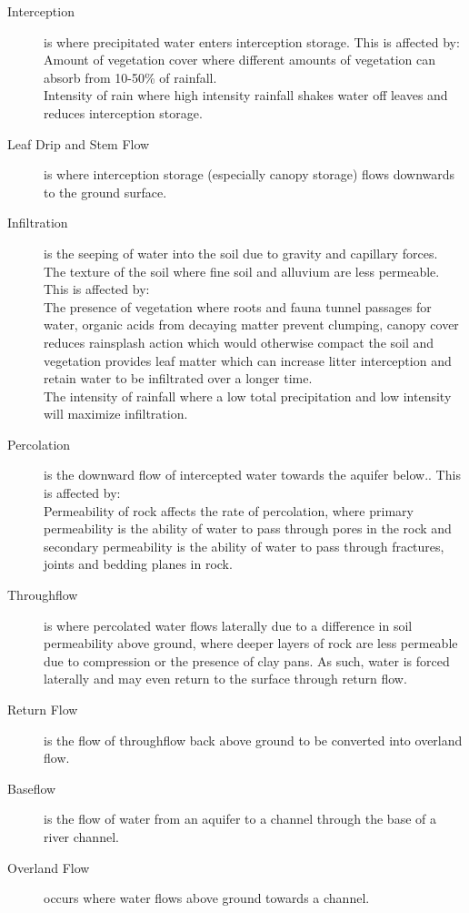 \documentclass[../../main]{subfiles}
\begin{document}
	\begin{description}
		\item[Interception] is where precipitated water enters interception storage. This is affected by:\\
			Amount of vegetation cover where different amounts of vegetation can absorb from 10-50\% of rainfall. \\
			Intensity of rain where high intensity rainfall shakes water off leaves and reduces interception storage.
		\item[Leaf Drip and Stem Flow] is where interception storage (especially canopy storage) flows downwards to the ground surface.
		\item[Infiltration] is the seeping of water into the soil due to gravity and capillary forces. \\
			The texture of the soil where fine soil and alluvium are less permeable. This is affected by:\\
			The presence of vegetation where roots and fauna tunnel passages for water, organic acids from decaying matter prevent clumping, canopy cover reduces rainsplash action which would otherwise compact the soil and vegetation provides leaf matter which can increase litter interception and retain water to be infiltrated over a longer time. \\
			The intensity of rainfall where a low total precipitation and low intensity will maximize infiltration.
		\item[Percolation] is the downward flow of intercepted water towards the aquifer below.. This is affected by: \\
			Permeability of rock affects the rate of percolation, where primary permeability is the ability of water to pass through pores in the rock and secondary permeability is the ability of water to pass through fractures, joints and bedding planes in rock.
		\item[Throughflow] is where percolated water flows laterally due to a difference in soil permeability above ground, where deeper layers of rock are less permeable due to compression or the presence of clay pans. As such, water is forced laterally and may even return to the surface through return flow.
		\item[Return Flow] is the flow of throughflow back above ground to be converted into overland flow.
		\item[Baseflow] is the flow of water from an aquifer to a channel through the base of a river channel.
		\item[Overland Flow] occurs where water flows above ground towards a channel.

\end{description}
\end{document}
